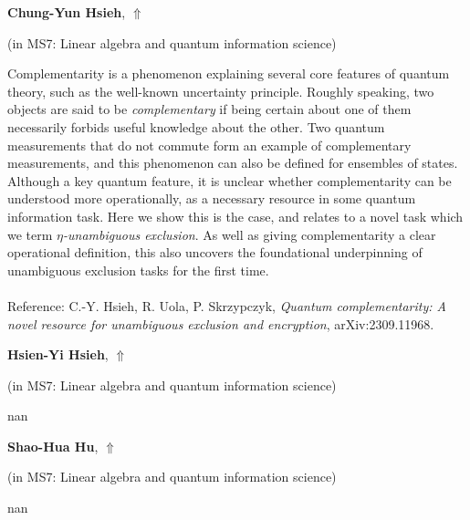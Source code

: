 \documentclass[ILAS2025-program.tex]{subfiles}
\begin{document}
\hypertarget{down0359}{}\begin{ilasabstract}
    
\textbf{Chung-Yun Hsieh},  \hfill \hyperlink{up0359}{$\Uparrow$}
    
    
(in {\color{mstitle}MS7: Linear algebra and quantum information science})
        
\mtskip
    Complementarity is a phenomenon explaining several core features of quantum theory, such as the well-known uncertainty principle. Roughly speaking, two objects are said to be {\em complementary} if being certain about one of them necessarily forbids useful knowledge about the other. Two quantum measurements that do not commute form an example of complementary measurements, and this phenomenon can also be defined for ensembles of states. Although a key quantum feature, it is unclear whether complementarity can be understood more operationally, as a necessary resource in some quantum information task. Here we show this is the case, and relates to a novel task which we term {\em $\eta$-unambiguous exclusion}. As well as giving complementarity a clear operational definition, this also uncovers the foundational underpinning of unambiguous exclusion tasks for the first time. \\\\
Reference: C.-Y. Hsieh, R. Uola, P. Skrzypczyk, {\em Quantum complementarity: A novel resource for unambiguous exclusion and encryption}, arXiv:2309.11968.

\end{ilasabstract}
    

\hypertarget{down0361}{}\begin{ilasabstract}
    
\textbf{Hsien-Yi Hsieh},  \hfill \hyperlink{up0361}{$\Uparrow$}
    
    
(in {\color{mstitle}MS7: Linear algebra and quantum information science})
        
\mtskip
    nan
\end{ilasabstract}
    

\hypertarget{down0208}{}\begin{ilasabstract}
    
\textbf{Shao-Hua Hu},  \hfill \hyperlink{up0208}{$\Uparrow$}
    
    
(in {\color{mstitle}MS7: Linear algebra and quantum information science})
        
\mtskip
    nan
\end{ilasabstract}
    
\end{document}
